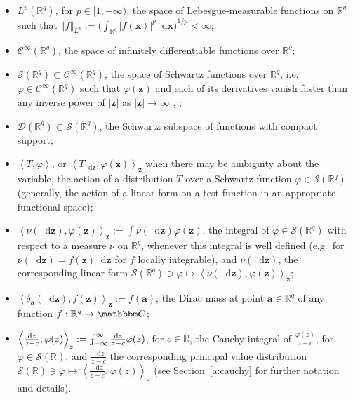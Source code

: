 \documentclass[11pt,A4,twoside]{article}
\numberwithin{equation}{section}
\newcommand{\g}[1]{{\color{teal}#1}}
\newcommand{\RED}[1]{{\color{red}#1}}
\renewcommand{\r}[1]{\RED{#1}}
\renewcommand{\vec}{\mathbf}
\newcommand{\intc}{\dashint_{-\infty}^\infty}
\renewcommand*\d{\mathop{}\!\mathrm{d}}
\newcommand{\Norm}[1]{\left\Vert#1 \right\Vert}
\newcommand{\inner}[1]{\left\langle#1 \right\rangle}
\newcommand{\x}{\mathbf{x}}
\newcommand{\z}{\mathbf{z}}
\newcommand{\R}{\mathbbm{R}}
\renewcommand{\S}{\mathcal{S}}
\newcommand{\D}{\mathcal{D}}
\newcommand{\C}{\mathcal{C}}
\def\Phint#1{\mathchoice
  {\XXint\displaystyle\textstyle{#1}}%
  {\XXint\textstyle\scriptstyle{#1}}%
  {\XXint\scriptstyle\scriptscriptstyle{#1}}%
  {\XXint\scriptscriptstyle\scriptscriptstyle{#1}}%
  \!\int}
\def\XXint#1#2#3{{\setbox0=\hbox{$#1{#2#3}{\int}$}
    \vcenter{\hbox{$#2#3$}}\kern-.5\wd0}}
\def\dashint{\Phint-}
\theoremstyle{definition}
\theoremstyle{remark}
\def\z{\vec z}
\def\R{\mathbb{R}}
\begin{document}
\begin{itemize}[leftmargin=*,topsep=2pt,itemsep=2pt,partopsep=2pt,parsep=0pt,listparindent=0pt]
\item $L^p(\R^q)$, for $p\in[1,+\infty)$, the space of Lebesgue-measurable functions on $\R^q$ such that $\Norm{f}_{L^p}:= \big(\int_{\R^q}|f(\x)|^p \d \x\big)^{1/p}<\infty$;
\item $\C^{\infty}(\R^q) $, the space of infinitely differentiable functions over $\R^q$;
\item $\S(\R^q)\subset \C^{\infty}(\R^q)$, the space of Schwartz functions over $\R^q$, i.e.\ $\varphi\in \C^{\infty}(\R^q) $ such that $\varphi(\z)$ and each of its derivatives vanish faster than any inverse power of $|\z|$ as $|\z| \to\infty$ \cite[page 395]{ramm1996radon}, \cite[page 480]{king_2009}; 
\item $\D(\R^q)\subset \S(\R^q)$, the Schwartz subspace of functions with compact support;
\item $\inner{T,\varphi}$, or $\inner{T_{\d\z},\varphi(\z)}_{\z}$ when there may be ambiguity about the variable, the action of a distribution $T$ over a Schwartz function $\varphi\in\S(\R^q)$ (generally, the action of a linear form on a test function in an appropriate functional space);
\item $\inner{\nu(\d\z) ,\varphi(\z)}_{\z} := \int \nu(\d\z)\varphi(\z)$, the integral of $\varphi\in\S(\R^q)$ with respect to a measure $\nu$ on $\R^q$, whenever this integral is well defined (e.g.\ for $\nu(\d\z)=f(\z)\d\z$ for $f$ locally integrable), and $\nu(\d\z)$, the corresponding linear form $\S(\R^q)\ni \varphi \mapsto \inner{\nu(\d\z) ,\varphi(\z)}_{\z}$;
\item $\inner{\delta_{\vec{a}}(\d\z), f(\z)}_\z := f(\vec{a})$, the Dirac mass at point $\vec {a}\in\R^q$ of any function $f : \R^q\to \mathbbm C$;
\item $\inner{\frac{\d z}{z-c} ,\varphi( z)}_{ z} :=\intc \frac{\d z}{z-c} \varphi( z)$, for $c\in\R$, the Cauchy integral of $\frac{\varphi( z)}{z-c}$, for $\varphi\in \S(\R)$, and $\frac{\d z}{z-c} $ the corresponding principal value distribution $\S(\R)\ni \varphi \mapsto \inner{\frac{\d z}{z-c} ,\varphi( z)}_{ z}$ (see Section~\ref{a:cauchy} for further notation and details).\\
\end{itemize}
\end{document}
